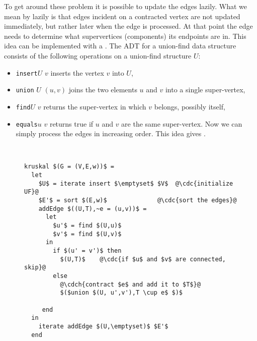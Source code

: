 To get around these problem it is possible to update the edges lazily.
What we mean by lazily is that edges incident on a contracted vertex
are not updated immediately, but rather later when the edge is
processed.  At that point the edge needs to determine what
supervertices (components) its endpoints are in.  This idea can be
implemented with a .  The ADT for a
union-find data structure consists of the following operations on a
union-find structure $U$:

\begin{itemize}
\item  \texttt{insert}$U$ $v$ inserts the vertex
$v$ into $U$,

\item \texttt{union} $U$ $(u,v)$ joins the two elements $u$ and $v$ into
a single super-vertex, 

\item \texttt{find}$U$ $v$ returns the super-vertex in which $v$
  belongs, possibly itself, 

\item \texttt{equals}$u$ $v$ returns true if $u$ and $v$ are the same
  super-vertex.  Now we can simply process the edges in increasing
  order.  This idea gives .
\end{itemize}

\begin{figure}[tb]
\begin{algorithm}~
\begin{lstlisting}
kruskal $(G = (V,E,w))$ =
  let
    $U$ = iterate insert $\emptyset$ $V$  @\cdc{initialize UF}@
    $E'$ = sort $(E,w)$              @\cdc{sort the edges}@
    addEdge $((U,T),~e = (u,v))$ =
      let
        $u'$ = find $(U,u)$
        $v'$ = find $(U,v)$
      in 
        if $(u' = v')$ then 
          $(U,T)$    @\cdc{if $u$ and $v$ are connected, skip}@
        else 
          @\cdch{contract $e$ and add it to $T$}@
          $($union $(U, u',v'),T \cup e$ $)$  

     end
  in
    iterate addEdge $(U,\emptyset)$ $E'$
  end
\end{lstlisting}
\label{alg:mst::kruskal}
\end{algorithm}
\end{figure}

